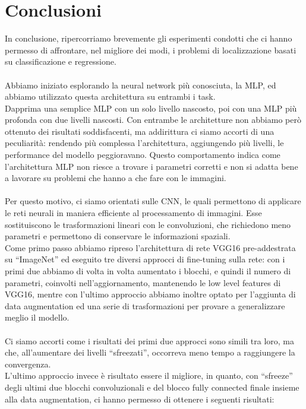 \chapter{Conclusioni}
In conclusione, ripercorriamo brevemente gli esperimenti condotti che ci hanno permesso di affrontare, nel migliore dei modi, i problemi di localizzazione basati su classificazione e regressione.
\\ \\
Abbiamo iniziato esplorando la neural network più conosciuta, la MLP, ed abbiamo utilizzato questa architettura su entrambi i task. \\
Dapprima una semplice MLP con un solo livello nascosto, poi con una MLP più profonda con due livelli nascosti. Con entrambe le architetture non abbiamo però ottenuto dei risultati soddisfacenti, ma addirittura ci siamo accorti di una peculiarità: rendendo più complessa l’architettura, aggiungendo più livelli, le performance del modello peggioravano. Questo comportamento indica come l’architettura MLP non riesce a trovare i parametri corretti e non si adatta bene a lavorare su problemi che hanno a che fare con le immagini.
\\ \\
Per questo motivo, ci siamo orientati sulle CNN, le quali permettono di applicare le reti neurali in maniera efficiente al processamento di immagini. Esse sostituiscono le trasformazioni lineari con le convoluzioni, che richiedono meno parametri e permettono di conservare le informazioni spaziali. \\
Come primo passo abbiamo ripreso l’architettura di rete VGG16 pre-addestrata su “ImageNet” ed eseguito tre diversi approcci di fine-tuning sulla rete: con i primi due abbiamo di volta in volta aumentato i blocchi, e quindi il numero di parametri, coinvolti nell’aggiornamento, mantenendo le low level features di VGG16, mentre con l’ultimo approccio abbiamo inoltre optato per l’aggiunta di data augmentation ed una serie di trasformazioni per provare a generalizzare meglio il modello.
\\ \\
Ci siamo accorti come i risultati dei primi due approcci sono simili tra loro, ma che, all’aumentare dei livelli “sfreezati”, occorreva meno tempo a raggiungere la convergenza. \\
L’ultimo approccio invece è risultato essere il migliore, in quanto, con “sfreeze” degli ultimi due blocchi convoluzionali e del blocco fully connected finale insieme alla data augmentation, ci hanno permesso di ottenere i seguenti risultati:
